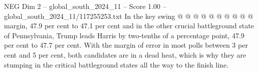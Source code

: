 \begin{textsample}{NEG Dim 2 – global\_south\_2024\_11 – Score 1.00 – global\_south\_2024\_11/117255253.txt}
In the key swing @ @ @ @ @ @ @ @ @ @ margin, 47.9 per cent to 47.1 per cent and in the other crucial battleground state of Pennsylvania, Trump leads Harris by two-tenths of a percentage point, 47.9 per cent to 47.7 per cent.
With the margin of error in most polls between 3 per cent and 5 per cent, both candidates are in a dead heat, which is why they are stumping in the critical battleground states all the way to the finish line.

\end{textsample}
